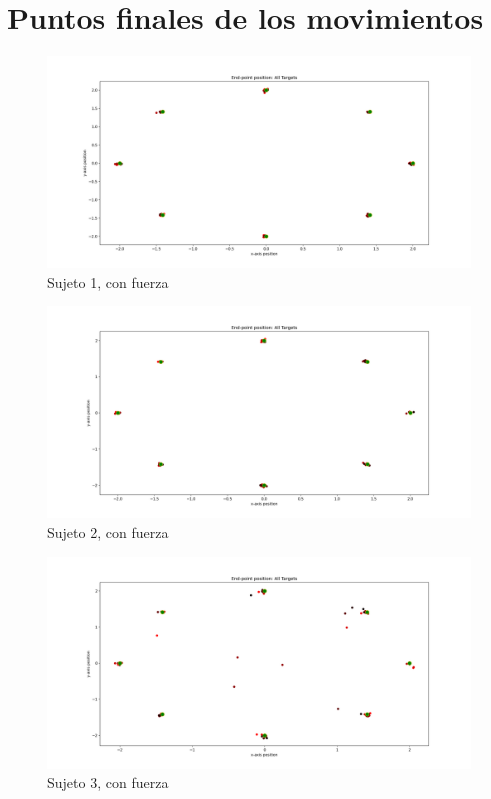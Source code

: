 \documentclass[a4paper,11pt, oneside]{book}
\begin{document}
\section{Puntos finales de los movimientos}
\label{anexo-3}
\begin{figure}[H]
	\includegraphics[width=\linewidth]{sujeto1/force/trayectorias_puntos}
	\caption{Sujeto 1, con fuerza}
	\label{1-2-1}
\end{figure}
\begin{figure}[H]
	\includegraphics[width=\linewidth]{sujeto2/force/trayectorias_puntos}
	\caption{Sujeto 2, con fuerza}
	\label{2-2-1}
\end{figure}
\begin{figure}[H]
	\includegraphics[width=\linewidth]{sujeto3/force/trayectorias_puntos}
	\caption{Sujeto 3, con fuerza}
	\label{3-2-1}
\end{figure}
\end{document}
